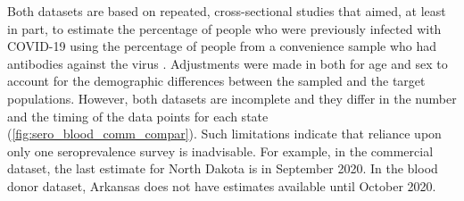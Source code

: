 \documentclass{article}
\begin{document}
Both datasets are based on repeated, cross-sectional studies that aimed, at
least in part, to estimate the percentage of people who were previously infected
with COVID-19 using the percentage of people from a convenience sample who had
antibodies against the virus \citep{bajema2021estimated, cdc2020data,
jones2021estimated}. Adjustments were made in both for age and sex to account
for the demographic differences between the sampled and the target populations.
However, both datasets are incomplete and they differ in the number and the
timing of the data points for each state (\autoref{fig:sero_blood_comm_compar}).
Such limitations indicate that reliance upon only one seroprevalence survey is
inadvisable. For example, in the commercial dataset, the last estimate for North
Dakota is in September 2020. In the blood donor dataset, Arkansas does not have
estimates available until October 2020. 
\end{document}
